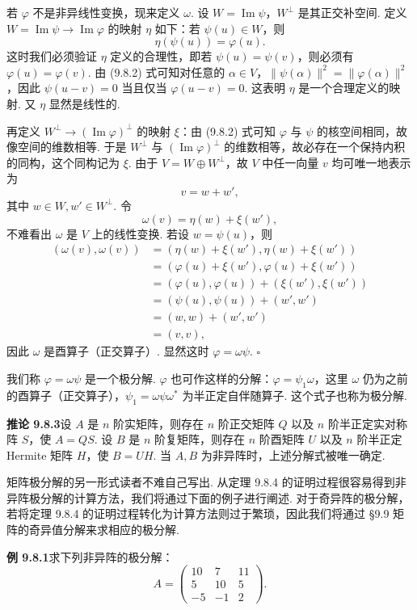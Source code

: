 \documentclass[UTF8,12pt,a4paper,fontset=fandol]{ctexart}
\begin{document}
若 $\varphi$ 不是非异线性变换，现来定义 $\omega$. 设 $W=\operatorname{Im}\psi$，$W^\perp$ 是其正交补空间. 定义 $W=\operatorname{Im}\psi\to\operatorname{Im}\varphi$ 的映射 $\eta$ 如下：若 $\psi(u)\in W$，则
\[
  \eta(\psi(u))=\varphi(u).
\]
这时我们必须验证 $\eta$ 定义的合理性，即若 $\psi(u)=\psi(v)$，则必须有 $\varphi(u)=\varphi(v)$. 由 (9.8.2) 式可知对任意的 $\alpha\in V$，$\|\psi(\alpha)\|^2=\|\varphi(\alpha)\|^2$，因此 $\psi(u-v)=0$ 当且仅当 $\varphi(u-v)=0$. 这表明 $\eta$ 是一个合理定义的映射. 又 $\eta$ 显然是线性的.

再定义 $W^\perp\to(\operatorname{Im}\varphi)^\perp$ 的映射 $\xi$：由 (9.8.2) 式可知 $\varphi$ 与 $\psi$ 的核空间相同，故像空间的维数相等. 于是 $W^\perp$ 与 $(\operatorname{Im}\varphi)^\perp$ 的维数相等，故必存在一个保持内积的同构，这个同构记为 $\xi$. 由于 $V=W\oplus W^\perp$，故 $V$ 中任一向量 $v$ 均可唯一地表示为
\[
  v=w+w',
\]
其中 $w\in W,w'\in W^\perp$. 令
\[
  \omega(v)=\eta(w)+\xi(w'),
\]
不难看出 $\omega$ 是 $V$ 上的线性变换. 若设 $w=\psi(u)$，则
\[
\begin{aligned}
  (\omega(v),\omega(v))
  &= (\eta(w)+\xi(w'),\eta(w)+\xi(w'))\\
  &= (\varphi(u)+\xi(w'),\varphi(u)+\xi(w'))\\
  &= (\varphi(u),\varphi(u))+(\xi(w'),\xi(w'))\\
  &= (\psi(u),\psi(u))+(w',w')\\
  &= (w,w)+(w',w')\\
  &= (v,v),
\end{aligned}
\]
因此 $\omega$ 是酉算子（正交算子）. 显然这时 $\varphi=\omega\psi$. $\square$

我们称 $\varphi=\omega\psi$ 是一个极分解. $\varphi$ 也可作这样的分解：$\varphi=\psi_1\omega$，这里 $\omega$ 仍为之前的酉算子（正交算子），$\psi_1=\omega\psi\omega^*$ 为半正定自伴随算子. 这个式子也称为极分解.

\noindent\textbf{推论 9.8.3}\quad 设 $A$ 是 $n$ 阶实矩阵，则存在 $n$ 阶正交矩阵 $Q$ 以及 $n$ 阶半正定实对称阵 $S$，使 $A=QS$. 设 $B$ 是 $n$ 阶复矩阵，则存在 $n$ 阶酉矩阵 $U$ 以及 $n$ 阶半正定 Hermite 矩阵 $H$，使 $B=UH$. 当 $A,B$ 为非异阵时，上述分解式被唯一确定.

矩阵极分解的另一形式读者不难自己写出. 从定理 9.8.4 的证明过程很容易得到非异阵极分解的计算方法，我们将通过下面的例子进行阐述. 对于奇异阵的极分解，若将定理 9.8.4 的证明过程转化为计算方法则过于繁琐，因此我们将通过 §9.9 矩阵的奇异值分解来求相应的极分解.

\noindent\textbf{例 9.8.1}\quad 求下列非异阵的极分解：
\[
  A=
  \left(\begin{array}{rrr}
    10 & 7 & 11\\
    5 & 10 & 5\\
    -5 & -1 & 2
  \end{array}\right).
\]
\end{document}
